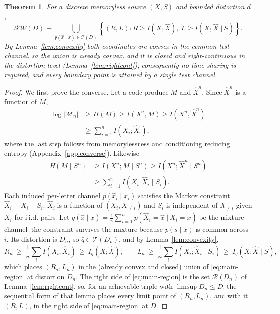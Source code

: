 \documentclass[11pt,onecolumn]{IEEEtran}
\newtheorem{theorem}{Theorem}
\newcommand{\hX}{\widehat{X}}
\newcommand{\hXn}{\widehat{X}^{n}}
\newcommand{\RW}{\mathcal{R}\!\mathcal{W}}
\begin{document}
\begin{theorem}\label{thm:main-region}
For a discrete memoryless source $(X,S)$ and bounded distortion $d$,
\begin{equation}
\boxed{
 \RW(D)
 =\bigcup_{p(\hat x\mid x)\in\mathcal T(D)}
 \left\{(R,L):
 R\ge I(X;\hX),\
 L\ge I(X;\hX\mid S)
 \right\}.}
 \label{eq:main-region}
\end{equation}
By Lemma~\ref{lem:convexity} both coordinates are convex in the common
test channel, so the union is already convex, and it is closed and
right-continuous in the distortion level (Lemma~\ref{lem:rightcont});
consequently no time sharing is required, and every boundary point is
attained by a single test channel.
\end{theorem}

\begin{proof}
We first prove the converse. Let a code produce $M$ and $\hXn$. Since $\hXn$
is a function of $M$,
\begin{align}
 \log|\mathcal M_n|
 &\ge H(M)\ge I(X^n;M)\ge I(X^n;\hXn)\nonumber\\
 &\ge \sum_{i=1}^{n}I(X_i;\hX_i),
 \label{eq:rate-conv}
\end{align}
where the last step follows from memorylessness and conditioning reducing
entropy (Appendix~\ref{app:converse}). Likewise,
\begin{align}
 H(M\mid S^n)
 &\ge I(X^n;M\mid S^n)
 \ge I(X^n;\hXn\mid S^n)\nonumber\\
 &\ge \sum_{i=1}^{n}I(X_i;\hX_i\mid S_i).
 \label{eq:work-conv}
\end{align}
Each induced per-letter channel $p(\hat x_i\mid x_i)$ satisfies the Markov
constraint $\hX_i-X_i-S_i$: $\hX_i$ is a function of $(X_i,X_{\ne i})$ and
$S_i$ is independent of $X_{\ne i}$ given $X_i$ for i.i.d. pairs. Let
$\bar q(\hat x\mid x)=\frac1n\sum_{i=1}^{n}p(\hX_i=\hat x\mid X_i=x)$ be
the mixture channel; the constraint survives the mixture because
$p(s\mid x)$ is common across $i$. Its distortion is $D_n$, so
$\bar q\in\mathcal T(D_n)$, and by Lemma~\ref{lem:convexity},
\begin{equation*}
 R_n\ \ge\ \frac1n\sum_i I(X_i;\hX_i)\ \ge\ I_{\bar q}(X;\hX),
 \qquad
 L_n\ \ge\ \frac1n\sum_i I(X_i;\hX_i\mid S_i)\ \ge\ I_{\bar q}(X;\hX\mid S),
\end{equation*}
which places $(R_n,L_n)$ in the (already convex and closed) union of
\eqref{eq:main-region} at distortion $D_n$. The right side of
\eqref{eq:main-region} is the set $\mathcal R(D_n)$ of
Lemma~\ref{lem:rightcont}, so, for an achievable triple with
$\limsup D_n\le D$, the sequential form of that lemma places every
limit point of $(R_n,L_n)$, and with it $(R,L)$, in the right side of
\eqref{eq:main-region} at $D$.


\end{proof}
\end{document}
